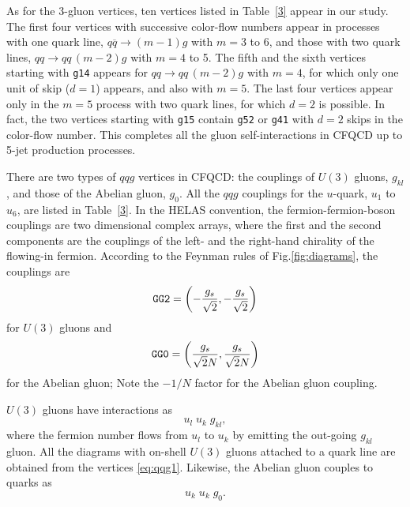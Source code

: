 \documentclass[a4paper,11pt]{article}
\begin{document}
As for the 3-gluon vertices, ten vertices listed in
Table~\ref{3} appear in our study. The first four vertices with
successive color-flow numbers appear in processes with one quark line,
$q\overline{q}\rightarrow (m-1)g$
with $m=3$ to $6$, and those with two quark lines, $qq\rightarrow
qq\,(m-2)g$ with $m=4$ to 5. The fifth
and the sixth vertices starting with {\tt g14} appears for $qq\rightarrow qq\,(m-2)g$
with $m=4$, for which only one unit of skip ($d=1$) appears, and
also with $m=5$. The
last four vertices appear only in the $m=5$ process with two quark lines, for which
$d=2$ is possible. In fact, the two vertices starting with {\tt g15}
contain {\tt g52} or {\tt g41} with $d=2$ skips in the color-flow
number. This completes all the gluon self-interactions in CFQCD up to
5-jet production processes.

There are two types of $qqg$ vertices in CFQCD: the couplings of $U(3)$
gluons, $g_{kl}$, and those of the Abelian gluon,
$g_0$. All the $qqg$ couplings for the $u$-quark, $u_1$ to $u_6$,  are
listed in Table~\ref{3}. In the HELAS convention, the
fermion-fermion-boson couplings are two dimensional complex arrays,
where the first and the second components are the couplings of the left-
and the right-hand chirality of the flowing-in fermion. According to the
Feynman rules of Fig.\ref{fig:diagrams}, the couplings are
\begin{equation}
{\tt GG2}=\left(-\frac{g_s}{\sqrt{2}},-\frac{g_s}{\sqrt{2}}\right)
 \end{equation}
 for $U(3)$ gluons and
 \begin{equation}
 {\tt GG0}=\left(\frac{g_s}{\sqrt{2}N},\frac{g_s}{\sqrt{2}N}\right)
  \end{equation}
  for the Abelian gluon; Note  the $-1/N$ factor for the Abelian gluon coupling.

$U(3)$ gluons have interactions as
\begin{equation}
 u_l\; u_k\; g_{kl},
  \label{eq:qqg1}
\end{equation}
 where the fermion number flows from $u_l$ to $u_k$ by emitting the out-going $g_{kl}$ gluon. All the diagrams with on-shell $U(3)$ gluons
 attached to a quark line are obtained from the vertices
 \eqref{eq:qqg1}. Likewise, the Abelian gluon couples to quarks as
\begin{equation}
 u_k\; u_k\; g_0.
\end{equation}
\end{document}
